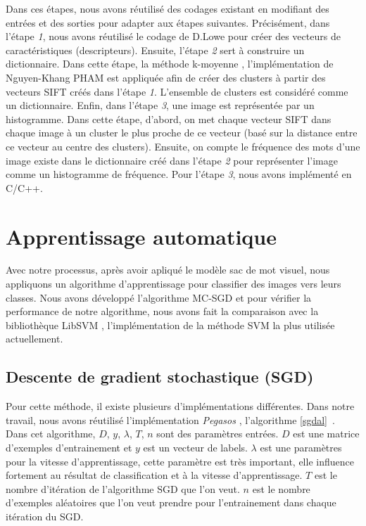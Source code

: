 Dans ces étapes, nous avons réutilisé des codages existant en modifiant des entrées et des sorties pour adapter aux étapes suivantes. Précisément, dans l'étape \textit{1}, nous avons réutilisé le codage de D.Lowe \cite{low99} pour créer des vecteurs de caractéristiques (descripteurs). Ensuite, l'étape \textit{2} sert à construire un dictionnaire. Dans cette étape, la méthode k-moyenne \cite{mq67}, l'implémentation de Nguyen-Khang PHAM \cite{khang} est appliquée afin de créer des clusters à partir des vecteurs SIFT créés dans l'étape \textit{1}. L'ensemble de clusters est considéré comme un dictionnaire. Enfin, dans l'étape \textit{3}, une image est représentée par un histogramme. Dans cette étape, d'abord, on met chaque vecteur SIFT dans chaque image à un cluster le plus proche de ce vecteur (basé sur la distance entre ce vecteur au centre des clusters). Ensuite, on compte le fréquence des mots d'une image existe dans le dictionnaire créé dans l'étape \textit{2} pour représenter l'image comme un histogramme de fréquence. Pour l'étape \textit{3}, nous avons implémenté en C/C++.

\section{Apprentissage automatique}
Avec notre processus, après avoir apliqué le modèle sac de mot visuel, nous appliquons un algorithme d'apprentissage pour classifier des images vers leurs classes. Nous avons développé l'algorithme MC-SGD et pour vérifier la performance de notre algorithme, nous avons fait la comparaison avec la bibliothèque LibSVM \cite{cl01}, l'implémentation de la méthode SVM la plus utilisée actuellement.

\subsection{Descente de gradient stochastique (SGD)}
Pour cette méthode, il existe plusieurs d'implémentations différentes. Dans notre travail, nous avons réutilisé l'implémentation \textit{Pegasos} \cite{sss07}, l'algorithme \ref{sgdal}~.\\

Dans cet algorithme, $D$, $y$, $\lambda$, $T$, $n$ sont des paramètres entrées. $D$ est une matrice d'exemples d'entrainement et $y$ est un vecteur de labels. $\lambda$ est une paramètres pour la vitesse d'apprentissage, cette paramètre est très important, elle influence fortement au résultat de classification et à la vitesse d'apprentissage. $T$ est le nombre d'itération de l'algorithme SGD que l'on veut. $n$ est le nombre d'exemples aléatoires que l'on veut prendre pour l'entrainement dans chaque itération du SGD.

